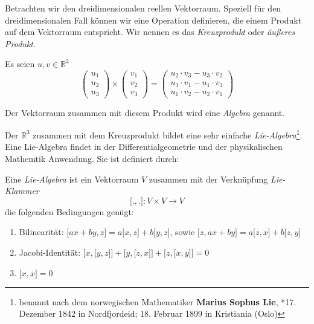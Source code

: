 Betrachten wir den dreidimensionalen reellen Vektorraum. Speziell für den dreidimensionalen Fall können wir eine Operation definieren, die einem Produkt auf dem Vektorraum entspricht. Wir nennen es das \textsl{Kreuzprodukt} oder \textsl{äußeres Produkt}. 

Es seien $u,v\in \mathbb{R}^3$
\begin{equation*}
\begin{pmatrix}
u_1\\u_2\\u_3
\end{pmatrix} \times 
\begin{pmatrix}
v_1\\v_2\\v_3
\end{pmatrix}  = \begin{pmatrix}
u_2\cdot v_3-u_3\cdot v_2 \\
u_3\cdot v_1-u_1\cdot v_3 \\
u_1\cdot v_2-u_2\cdot v_1
\end{pmatrix}
\end{equation*}

\begin{definition}
Der Vektorraum zusammen mit diesem Produkt wird eine \textsl{Algebra} genannt.
\end{definition}

Der $\mathbb{R}^3$ zusammen mit dem Kreuzprodukt bildet eine sehr einfache \textsl{Lie-Algebra}\footnote{benannt nach dem norwegischen Mathematiker \textbf{Marius Sophus Lie}, *17. Dezember 1842 in Nordfjordeid; 18. Februar 1899 in Kristiania (Oslo)}. Eine Lie-Algebra findet in der Differentialgeometrie und der physikalischen Mathemtik Anwendung. Sie ist definiert durch:

\begin{definition}
Eine \textsl{Lie-Algebra} ist ein Vektorraum $V$ zusammen mit der Verknüpfung \textsl{Lie-Klammer}
\[
\lbrack .,. \rbrack : V \times V \longrightarrow V
\]
die folgenden Bedingungen genügt:
\begin{enumerate}
\item Bilinearität: $\lbrack ax+by,z\rbrack = a\lbrack x,z\rbrack+b\lbrack y,z\rbrack$, sowie $\lbrack z, ax+by\rbrack = a\lbrack z,x\rbrack+b\lbrack z,y\rbrack$
\item Jacobi-Identität: $\lbrack x, \lbrack y,z\rbrack\rbrack + \lbrack y, \lbrack z,x\rbrack\rbrack +\lbrack z, \lbrack x,y \rbrack\rbrack = 0$
\item $\lbrack x,x \rbrack = 0$
\end{enumerate}
\end{definition}

